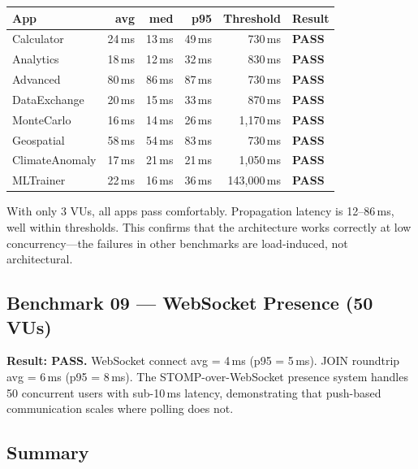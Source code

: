 \documentclass[11pt,a4paper]{article}
\begin{document}
\begin{center}
\begin{tabular}{lrrrrl}
\toprule
\textbf{App} & \textbf{avg} & \textbf{med} & \textbf{p95} & \textbf{Threshold} & \textbf{Result} \\
\midrule
Calculator     &   24\,ms &   13\,ms &   49\,ms &    730\,ms & \textbf{PASS} \\
Analytics      &   18\,ms &   12\,ms &   32\,ms &    830\,ms & \textbf{PASS} \\
Advanced       &   80\,ms &   86\,ms &   87\,ms &    730\,ms & \textbf{PASS} \\
DataExchange   &   20\,ms &   15\,ms &   33\,ms &    870\,ms & \textbf{PASS} \\
MonteCarlo     &   16\,ms &   14\,ms &   26\,ms &  1,170\,ms & \textbf{PASS} \\
Geospatial     &   58\,ms &   54\,ms &   83\,ms &    730\,ms & \textbf{PASS} \\
ClimateAnomaly &   17\,ms &   21\,ms &   21\,ms &  1,050\,ms & \textbf{PASS} \\
MLTrainer      &   22\,ms &   16\,ms &   36\,ms & 143,000\,ms & \textbf{PASS} \\
\bottomrule
\end{tabular}
\end{center}

\noindent With only 3 VUs, all apps pass comfortably. Propagation
latency is 12--86\,ms, well within thresholds. This confirms that
the architecture works correctly at low concurrency---the failures
in other benchmarks are load-induced, not architectural.

\subsection{Benchmark 09 — WebSocket Presence (50 VUs)}

\textbf{Result: PASS.} WebSocket connect avg = 4\,ms (p95 = 5\,ms).
JOIN roundtrip avg = 6\,ms (p95 = 8\,ms). The STOMP-over-WebSocket
presence system handles 50 concurrent users with sub-10\,ms latency,
demonstrating that push-based communication scales where polling
does not.

\subsection{Summary}
\end{document}
